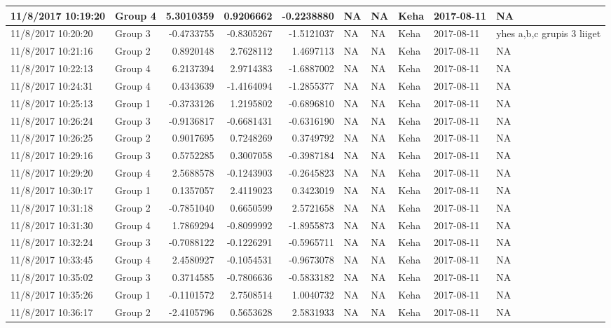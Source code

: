 \documentclass[]{article}
\begin{document}
\begin{tabular}{l|l|r|r|r|l|l|l|l|l}
\hline
11/8/2017 10:19:20 & Group 4 & 5.3010359 & 0.9206662 & -0.2238880 & NA & NA & Keha & 2017-08-11 & NA\\
\hline
11/8/2017 10:20:20 & Group 3 & -0.4733755 & -0.8305267 & -1.5121037 & NA & NA & Keha & 2017-08-11 & yhes a,b,c grupis 3 liiget\\
\hline
11/8/2017 10:21:16 & Group 2 & 0.8920148 & 2.7628112 & 1.4697113 & NA & NA & Keha & 2017-08-11 & NA\\
\hline
11/8/2017 10:22:13 & Group 4 & 6.2137394 & 2.9714383 & -1.6887002 & NA & NA & Keha & 2017-08-11 & NA\\
\hline
11/8/2017 10:24:31 & Group 4 & 0.4343639 & -1.4164094 & -1.2855377 & NA & NA & Keha & 2017-08-11 & NA\\
\hline
11/8/2017 10:25:13 & Group 1 & -0.3733126 & 1.2195802 & -0.6896810 & NA & NA & Keha & 2017-08-11 & NA\\
\hline
11/8/2017 10:26:24 & Group 3 & -0.9136817 & -0.6681431 & -0.6316190 & NA & NA & Keha & 2017-08-11 & NA\\
\hline
11/8/2017 10:26:25 & Group 2 & 0.9017695 & 0.7248269 & 0.3749792 & NA & NA & Keha & 2017-08-11 & NA\\
\hline
11/8/2017 10:29:16 & Group 3 & 0.5752285 & 0.3007058 & -0.3987184 & NA & NA & Keha & 2017-08-11 & NA\\
\hline
11/8/2017 10:29:20 & Group 4 & 2.5688578 & -0.1243903 & -0.2645823 & NA & NA & Keha & 2017-08-11 & NA\\
\hline
11/8/2017 10:30:17 & Group 1 & 0.1357057 & 2.4119023 & 0.3423019 & NA & NA & Keha & 2017-08-11 & NA\\
\hline
11/8/2017 10:31:18 & Group 2 & -0.7851040 & 0.6650599 & 2.5721658 & NA & NA & Keha & 2017-08-11 & NA\\
\hline
11/8/2017 10:31:30 & Group 4 & 1.7869294 & -0.8099992 & -1.8955873 & NA & NA & Keha & 2017-08-11 & NA\\
\hline
11/8/2017 10:32:24 & Group 3 & -0.7088122 & -0.1226291 & -0.5965711 & NA & NA & Keha & 2017-08-11 & NA\\
\hline
11/8/2017 10:33:45 & Group 4 & 2.4580927 & -0.1054531 & -0.9673078 & NA & NA & Keha & 2017-08-11 & NA\\
\hline
11/8/2017 10:35:02 & Group 3 & 0.3714585 & -0.7806636 & -0.5833182 & NA & NA & Keha & 2017-08-11 & NA\\
\hline
11/8/2017 10:35:26 & Group 1 & -0.1101572 & 2.7508514 & 1.0040732 & NA & NA & Keha & 2017-08-11 & NA\\
\hline
11/8/2017 10:36:17 & Group 2 & -2.4105796 & 0.5653628 & 2.5831933 & NA & NA & Keha & 2017-08-11 & NA\\

\end{tabular}
\end{document}
